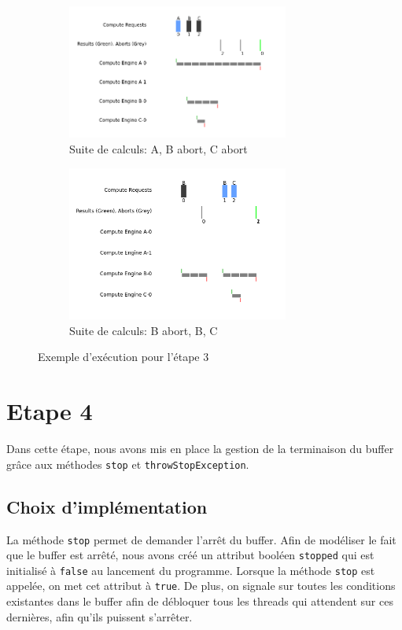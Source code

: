 \documentclass{article}
\begin{document}
\begin{figure}[h]
    \begin{subfigure}{0.45\textwidth}
        \centering
        \includegraphics[width=0.8\textwidth]{figures/A_B_Abort_C_Abort}
        \caption{Suite de calculs: A, B abort, C abort}
    \end{subfigure}
    \begin{subfigure}{0.45\textwidth}
        \centering
        \includegraphics[width=0.8\textwidth]{figures/B_Abort_B_C}
        \caption{Suite de calculs: B abort, B, C}
    \end{subfigure}
    \caption{Exemple d'exécution pour l'étape 3}
    \label{fig:full3}
\end{figure}

\pagebreak

\section{Etape 4}
Dans cette étape, nous avons mis en place la gestion de la terminaison du buffer grâce aux méthodes \texttt{stop}
et \texttt{throwStopException}.

\subsection{Choix d'implémentation}
La méthode \texttt{stop} permet de demander l'arrêt du buffer.  Afin de modéliser
le fait que le buffer est arrêté, nous avons créé un attribut booléen \texttt{stopped} qui est initialisé à \texttt{false}
au lancement du programme. Lorsque la méthode \texttt{stop} est appelée, on met cet attribut à \texttt{true}. De plus,
on signale sur toutes les conditions existantes dans le buffer afin de débloquer tous les threads qui attendent sur
ces dernières, afin qu'ils puissent s'arrêter.
\end{document}
